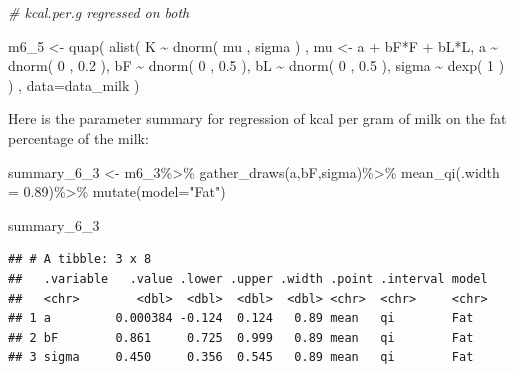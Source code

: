 \documentclass[
]{book}
\newenvironment{Shaded}{\begin{snugshade}}{\end{snugshade}}
\newcommand{\AttributeTok}[1]{\textcolor[rgb]{0.77,0.63,0.00}{#1}}
\newcommand{\CommentTok}[1]{\textcolor[rgb]{0.56,0.35,0.01}{\textit{#1}}}
\newcommand{\DecValTok}[1]{\textcolor[rgb]{0.00,0.00,0.81}{#1}}
\newcommand{\FloatTok}[1]{\textcolor[rgb]{0.00,0.00,0.81}{#1}}
\newcommand{\FunctionTok}[1]{\textcolor[rgb]{0.00,0.00,0.00}{#1}}
\newcommand{\NormalTok}[1]{#1}
\newcommand{\OtherTok}[1]{\textcolor[rgb]{0.56,0.35,0.01}{#1}}
\newcommand{\SpecialCharTok}[1]{\textcolor[rgb]{0.00,0.00,0.00}{#1}}
\newcommand{\StringTok}[1]{\textcolor[rgb]{0.31,0.60,0.02}{#1}}
\begin{document}
\begin{Shaded}
\begin{Highlighting}[]
\CommentTok{\# kcal.per.g regressed on both }

\NormalTok{m6\_5 }\OtherTok{\textless{}{-}} \FunctionTok{quap}\NormalTok{( }
  \FunctionTok{alist}\NormalTok{(}
\NormalTok{    K }\SpecialCharTok{\textasciitilde{}} \FunctionTok{dnorm}\NormalTok{( mu , sigma )}
\NormalTok{    , mu }\OtherTok{\textless{}{-}}\NormalTok{ a }\SpecialCharTok{+}\NormalTok{ bF}\SpecialCharTok{*}\NormalTok{F }\SpecialCharTok{+}\NormalTok{ bL}\SpecialCharTok{*}\NormalTok{L, }
\NormalTok{    a }\SpecialCharTok{\textasciitilde{}} \FunctionTok{dnorm}\NormalTok{( }\DecValTok{0}\NormalTok{ , }\FloatTok{0.2}\NormalTok{ ),}
\NormalTok{    bF }\SpecialCharTok{\textasciitilde{}} \FunctionTok{dnorm}\NormalTok{( }\DecValTok{0}\NormalTok{ , }\FloatTok{0.5}\NormalTok{ ),}
\NormalTok{    bL }\SpecialCharTok{\textasciitilde{}} \FunctionTok{dnorm}\NormalTok{( }\DecValTok{0}\NormalTok{ , }\FloatTok{0.5}\NormalTok{ ), }
\NormalTok{    sigma }\SpecialCharTok{\textasciitilde{}} \FunctionTok{dexp}\NormalTok{( }\DecValTok{1}\NormalTok{ )}
\NormalTok{) , }\AttributeTok{data=}\NormalTok{data\_milk )}
\end{Highlighting}
\end{Shaded}

Here is the parameter summary for regression of kcal per gram of milk on the fat percentage of the milk:

\begin{Shaded}
\begin{Highlighting}[]
\NormalTok{summary\_6\_3 }\OtherTok{\textless{}{-}}\NormalTok{ m6\_3}\SpecialCharTok{\%\textgreater{}\%}
  \FunctionTok{gather\_draws}\NormalTok{(a,bF,sigma)}\SpecialCharTok{\%\textgreater{}\%}
  \FunctionTok{mean\_qi}\NormalTok{(}\AttributeTok{.width =} \FloatTok{0.89}\NormalTok{)}\SpecialCharTok{\%\textgreater{}\%}
  \FunctionTok{mutate}\NormalTok{(}\AttributeTok{model=}\StringTok{"Fat"}\NormalTok{)}

\NormalTok{summary\_6\_3}
\end{Highlighting}
\end{Shaded}

\begin{verbatim}
## # A tibble: 3 x 8
##   .variable   .value .lower .upper .width .point .interval model
##   <chr>        <dbl>  <dbl>  <dbl>  <dbl> <chr>  <chr>     <chr>
## 1 a         0.000384 -0.124  0.124   0.89 mean   qi        Fat  
## 2 bF        0.861     0.725  0.999   0.89 mean   qi        Fat  
## 3 sigma     0.450     0.356  0.545   0.89 mean   qi        Fat
\end{verbatim}
\end{document}
